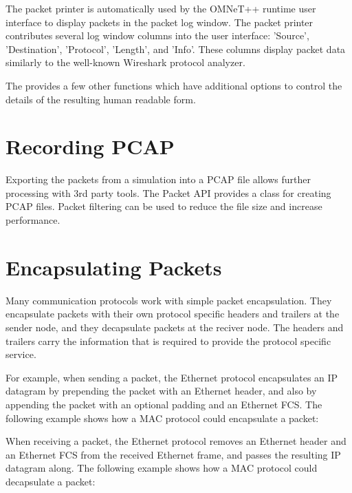The packet printer is automatically used by the OMNeT++ runtime user interface
to display packets in the packet log window. The packet printer contributes
several log window columns into the user interface: 'Source', 'Destination',
'Protocol', 'Length', and 'Info'. These columns display packet data similarly to
the well-known Wireshark protocol analyzer.


The  provides a few other functions which have
additional options to control the details of the resulting human readable form.

\section{Recording PCAP}

Exporting the packets from a simulation into a PCAP file allows further
processing with 3rd party tools. The Packet API provides a 
class for creating PCAP files. Packet filtering can be used to reduce the file
size and increase performance.


\section{Encapsulating Packets}

Many communication protocols work with simple packet encapsulation. They
encapsulate packets with their own protocol specific headers and trailers at the
sender node, and they decapsulate packets at the reciver node. The headers and
trailers carry the information that is required to provide the protocol specific
service.

For example, when sending a packet, the Ethernet protocol encapsulates an IP
datagram by prepending the packet with an Ethernet header, and also by appending
the packet with an optional padding and an Ethernet FCS. The following example
shows how a MAC protocol could encapsulate a packet:


When receiving a packet, the Ethernet protocol removes an Ethernet header and an
Ethernet FCS from the received Ethernet frame, and passes the resulting IP
datagram along. The following example shows how a MAC protocol could decapsulate
a packet:

